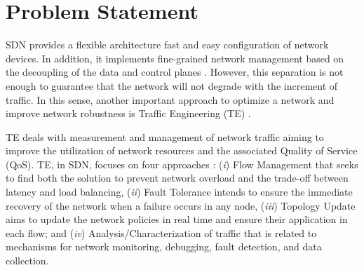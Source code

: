 \section{Problem Statement}
\label{sec:problem_statement}


SDN provides a flexible architecture fast and easy configuration of network devices. In addition, it implements fine-grained network management based on the decoupling of the data and control planes \cite{herrera_2016:nfv_survey}. However, this separation is not enough to guarantee that the network will not degrade with the increment of traffic. In this sense, another important approach to optimize a network and improve network robustness is Traffic Engineering (TE) \cite{ian_2014:a_road_map_sdn}.

TE deals with measurement and management of network traffic aiming to improve the utilization of network resources and the associated Quality of Service (QoS). TE, in SDN, focuses on four approaches \cite{ian_2014:a_road_map_sdn, z_shu_2016:TE_SDN_measure_manage}: (\textit{i}) Flow Management that seeks to find both the solution to prevent network overload and the trade-off between latency and load balancing, (\textit{ii}) Fault Tolerance intends to ensure the immediate recovery of the network when a failure occurs in any node, (\textit{iii}) Topology Update aims to update the network policies in real time and ensure their application in each flow; and (\textit{iv}) Analysis/Characterization of traffic that is related to mechanisms for network monitoring, debugging, fault detection, and data collection.

